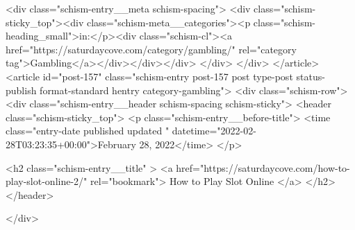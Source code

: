 {		<div class="schism-entry__meta schism-spacing">			<div class="schism-sticky_top"><div class="schism-meta__categories"><p class="schism-heading_small">in:</p><div class="schism-cl"><a href="https://saturdaycove.com/category/gambling/" rel="category tag">Gambling</a></div></div></div>		</div>
	</div>
</article>
<article id="post-157" class="schism-entry post-157 post type-post status-publish format-standard hentry category-gambling">
	<div class="schism-row">		<div class="schism-entry__header schism-spacing schism-sticky">			<header class="schism-sticky_top">				<p class="schism-entry__before-title">
					<time class="entry-date published updated " datetime="2022-02-28T03:23:35+00:00">February 28, 2022</time>				</p>

				<h2 class="schism-entry__title" >
					<a href="https://saturdaycove.com/how-to-play-slot-online-2/" rel="bookmark">
						How to Play Slot Online					</a>
				</h2>
			</header>

					</div>

}
